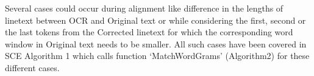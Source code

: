 \documentclass[12pt]{article}
\begin{document}
Several cases could occur during alignment like difference in the lengths of linetext between OCR and Original text or while considering the first, second or the last tokens from the Corrected linetext for which the corresponding word window in Original text needs to be smaller. All such cases have been covered in SCE Algorithm 1 which calls function `MatchWordGrams' (Algorithm2) for these different cases. 

 

\end{document}
